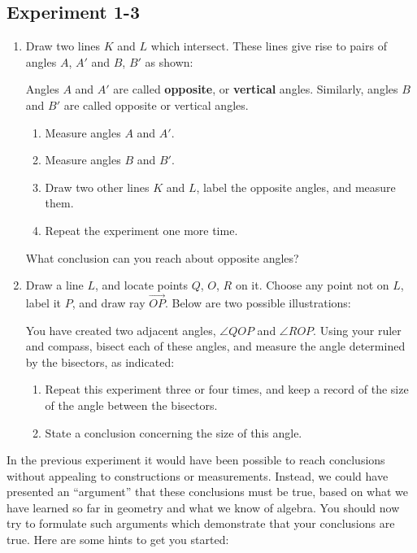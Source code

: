 \documentclass[12pt]{book} %
\begin{document}
\subsection*{Experiment 1-3}

\begin{enumerate}
	\item Draw two lines $K$ and $L$ which intersect. These lines give rise to pairs of angles $A$, $A'$ and $B$, $B'$ as shown:
	
	
	Angles $A$ and $A'$ are called \textbf{opposite}, or \textbf{vertical} angles. Similarly, angles $B$ and $B'$ are called opposite or vertical angles.
	\begin{enumerate}
		\item Measure angles $A$ and $A'$.
		\item Measure angles $B$ and $B'$.
		\item Draw two other lines $K$ and $L$, label the opposite angles, and measure them.
		\item Repeat the experiment one more time.
	\end{enumerate}
	What conclusion can you reach about opposite angles?
	
	\item Draw a line $L$, and locate points $Q$, $O$, $R$ on it. Choose any point not on $L$, label it $P$, and draw ray $\overrightarrow{OP}$. Below are two possible illustrations:
	
	
	You have created two adjacent angles, $\angle QOP$ and $\angle ROP$. Using your ruler and compass, bisect each of these angles, and measure the angle determined by the bisectors, as indicated:
	
	
	\begin{enumerate}
		\item Repeat this experiment three or four times, and keep a record of the size of the angle between the bisectors.
		\item State a conclusion concerning the size of this angle.
	\end{enumerate}
\end{enumerate}

In the previous experiment it would have been possible to reach conclusions without appealing to constructions or measurements. Instead, we could have presented an ``argument'' that these conclusions must be true, based on what we have learned so far in geometry and what we know of algebra. You should now try to formulate such arguments which demonstrate that your conclusions are true. Here are some hints to get you started:
\end{document}
